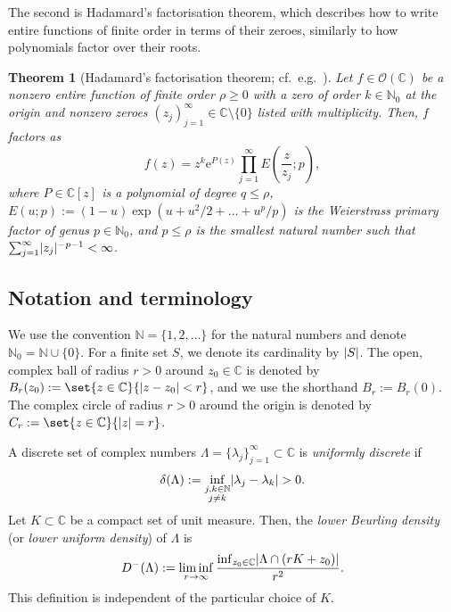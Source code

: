 \documentclass{article}
\newcommand{\bbC}{\mathbb{C}}
\newcommand{\bbN}{\mathbb{N}}
\newcommand{\calO}{\mathcal{O}}
\newcommand{\rme}{\mathrm{e}}
\DeclarePairedDelimiter{\abs}{\lvert}{\rvert}
\newtheorem{theorem}{Theorem}
\theoremstyle{remark}
\begin{document}
    The second is Hadamard's factorisation theorem, which describes how to write entire functions of finite order in terms of their zeroes, similarly to how polynomials factor over their roots.

    \begin{theorem}[{Hadamard's factorisation theorem; cf.~e.g.~\cite[Section~8.24 on p.~250]{Titchmarsh1939Theory}}]\label{thm:HadmardFactorisation}
        Let $f \in \calO(\bbC)$ be a nonzero entire function of finite order $\rho \geq 0$ with a zero of order $k \in \bbN_0$ at the origin and nonzero zeroes $(z_j)_{j=1}^\infty \in \bbC \setminus \{0\}$ listed with multiplicity. Then, $f$ factors as 
        \begin{equation*}
            f(z) = z^k \rme^{P(z)} \prod_{j = 1}^\infty E\left( \frac{z}{z_j}; p \right),
        \end{equation*}
        where $P \in \bbC[z]$ is a polynomial of degree $q \leq \rho$, $E(u; p) := (1 - u)\exp(u + u^2/2 + \dots + u^p/p)$ is the Weierstrass primary factor of genus $p \in \bbN_0$, and $p \leq \rho$ is the smallest natural number such that $\sum_{j=1}^\infty \abs{z_j}^{-p-1} < \infty$.
    \end{theorem}

    \subsection{Notation and terminology}\label{sec:Notation}
    
    We use the convention $\bbN = \lbrace 1, 2, \dots \rbrace$ for the natural numbers and denote $\bbN_0 = \bbN \cup \lbrace 0 \rbrace$. For a finite set $S$, we denote its cardinality by $\abs{S}$. The open, complex ball of radius $r > 0$ around $z_0 \in \bbC$ is denoted by $B_r(z_0) := \set{z \in \bbC}{ \abs{z-z_0} < r }$, and we use the shorthand $B_r := B_r(0)$. The complex circle of radius $r > 0$ around the origin is denoted by $C_r := \set{ z \in \bbC }{ \abs{z} = r }$.
    
    A discrete set of complex numbers $\Lambda = \lbrace \lambda_j \rbrace_{j = 1}^\infty \subset \bbC$ is \emph{uniformly discrete} if
    \begin{equation*}
        \delta(\Lambda) := \inf_{\substack{j,k \in \bbN\\j \neq k}} \abs{\lambda_j - \lambda_k} > 0.
    \end{equation*}
    Let $K \subset \mathbb{C}$ be a compact set of unit measure. Then, the \emph{lower Beurling density} (or \emph{lower uniform density}) of $\Lambda$ is
    \begin{equation*}
        D^{-}(\Lambda) := \liminf_{r \to \infty} \frac{ \inf_{z_0 \in \bbC}  \abs{\Lambda \cap (rK + z_0) } }{ r^2 }.
    \end{equation*}
    This definition is independent of the particular choice of $K$.
    
\end{document}

